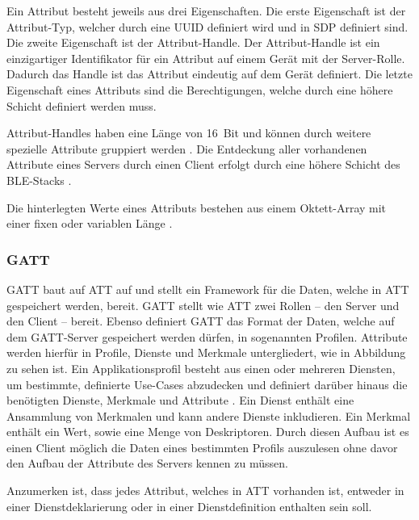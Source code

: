 Ein Attribut besteht jeweils aus drei Eigenschaften. Die erste Eigenschaft ist der Attribut-Typ, welcher durch eine \acf{UUID} definiert wird und in \ac{SDP} definiert sind. Die zweite Eigenschaft ist der Attribut-Handle. Der Attribut-Handle ist ein einzigartiger Identifikator für ein Attribut auf einem Gerät mit der Server-Rolle. Dadurch das Handle ist das Attribut eindeutig auf dem Gerät definiert. Die letzte Eigenschaft eines Attributs sind die Berechtigungen, welche durch eine höhere Schicht definiert werden muss. \cite[S.~1410ff.]{bluetoothCore}

Attribut-Handles haben eine Länge von 16~Bit und können durch weitere spezielle Attribute gruppiert werden \cite[S.~1412f.]{bluetoothCore}. Die Entdeckung aller vorhandenen Attribute eines Servers durch einen Client erfolgt durch eine höhere Schicht des \ac{BLE}-Stacks \cite[S.~1410]{bluetoothCore}.

Die hinterlegten Werte eines Attributs bestehen aus einem Oktett-Array mit einer fixen oder variablen Länge \cite[S.~1413]{bluetoothCore}.

\subsubsection{\acf{GATT}}
\ac{GATT} baut auf \ac{ATT} auf und stellt ein Framework für die Daten, welche in \ac{ATT} gespeichert werden, bereit. \ac{GATT} stellt wie \ac{ATT} zwei Rollen -- den Server und den Client -- bereit. Ebenso definiert \ac{GATT} das Format der Daten, welche auf dem \ac{GATT}-Server gespeichert werden dürfen, in sogenannten Profilen. Attribute werden hierfür in Profile, Dienste und Merkmale untergliedert, wie in Abbildung  zu sehen ist. Ein Applikationsprofil besteht aus einen oder mehreren Diensten, um bestimmte, definierte Use-Cases abzudecken und definiert darüber hinaus die benötigten Dienste, Merkmale und Attribute \cite[S.~207]{bluetoothCore}. Ein Dienst enthält eine Ansammlung von Merkmalen und kann andere Dienste inkludieren. Ein Merkmal enthält ein Wert, sowie eine Menge von Deskriptoren. Durch diesen Aufbau ist es einen Client möglich die Daten eines bestimmten Profils auszulesen ohne davor den Aufbau der Attribute des Servers kennen zu müssen. \cite[S.~280, S.~1480]{bluetoothCore}

Anzumerken ist, dass jedes Attribut, welches in \ac{ATT} vorhanden ist, entweder in einer Dienstdeklarierung oder in einer Dienstdefinition enthalten sein soll. \cite[S.~1483]{bluetoothCore}

